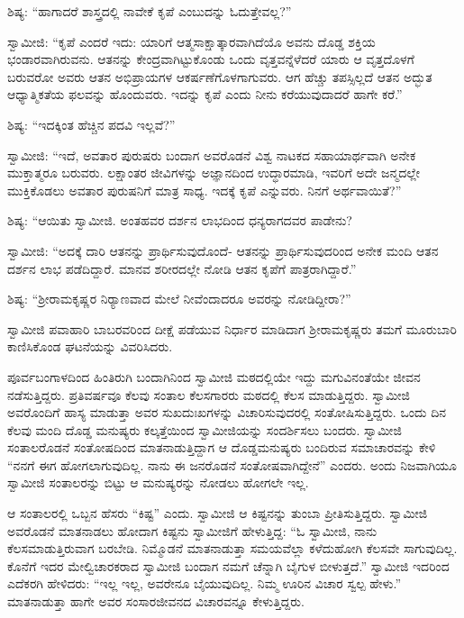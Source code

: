  ಶಿಷ್ಯ: “ಹಾಗಾದರೆ ಶಾಸ್ತ್ರದಲ್ಲಿ ನಾವೇಕೆ ಕೃಪೆ ಎಂಬುದನ್ನು ಓದುತ್ತೇವಲ್ಲ?” 

 ಸ್ವಾಮೀಜಿ: “ಕೃಪೆ ಎಂದರೆ ಇದು: ಯಾರಿಗೆ ಆತ್ಮಸಾಕ್ಷಾತ್ಕಾರವಾಗಿದೆಯೊ ಅವನು ದೊಡ್ಡ ಶಕ್ತಿಯ ಭಂಡಾರವಾಗಿರುವನು. ಆತನನ್ನು ಕೇಂದ್ರವಾಗಿಟ್ಟುಕೊಂಡು ಒಂದು ವೃತ್ತವನ್ನೆಳೆದರೆ ಯಾರು ಆ ವೃತ್ತದೊಳಗೆ ಬರುವರೋ ಅವರು ಆತನ ಅಭಿಪ್ರಾಯಗಳ ಆಕರ್ಷಣೆಗೊಳಗಾಗುವರು. ಆಗ ಹೆಚ್ಚು ತಪಸ್ಸಿಲ್ಲದೆ ಆತನ ಅದ್ಭುತ ಆಧ್ಯಾತ್ಮಿಕತೆಯ ಫಲವನ್ನು ಹೊಂದುವರು. ಇದನ್ನು ಕೃಪೆ ಎಂದು ನೀನು ಕರೆಯುವುದಾದರೆ ಹಾಗೇ ಕರೆ.” 

 ಶಿಷ್ಯ: “ಇದಕ್ಕಿಂತ ಹೆಚ್ಚಿನ ಪದವಿ ಇಲ್ಲವೆ?” 

 ಸ್ವಾಮೀಜಿ: “ಇದೆ, ಅವತಾರ ಪುರುಷರು ಬಂದಾಗ ಅವರೊಡನೆ ವಿಶ್ವ ನಾಟಕದ ಸಹಾಯಾರ್ಥವಾಗಿ ಅನೇಕ ಮುಕ್ತಾತ್ಮರೂ ಬರುವರು. ಲಕ್ಷಾಂತರ ಜೀವಿಗಳನ್ನು ಅಜ್ಞಾನದಿಂದ ಉದ್ಧಾರಮಾಡಿ, ಇವರಿಗೆ ಅದೇ ಜನ್ಮದಲ್ಲೇ ಮುಕ್ತಿಕೊಡಲು ಅವತಾರ ಪುರುಷನಿಗೆ ಮಾತ್ರ ಸಾಧ್ಯ. ಇದಕ್ಕೆ ಕೃಪೆ ಎನ್ನುವರು. ನಿನಗೆ ಅರ್ಥವಾಯಿತೆ?” 

 ಶಿಷ್ಯ: “ಆಯಿತು ಸ್ವಾಮೀಜಿ. ಅಂತಹವರ ದರ್ಶನ ಲಾಭದಿಂದ ಧನ್ಯರಾಗದವರ ಪಾಡೇನು? 

 ಸ್ವಾಮೀಜಿ: “ಅದಕ್ಕೆ ದಾರಿ ಆತನನ್ನು ಪ್ರಾರ್ಥಿಸುವುದೊಂದೆ- ಆತನನ್ನು ಪ್ರಾರ್ಥಿಸುವುದರಿಂದ ಅನೇಕ ಮಂದಿ ಆತನ ದರ್ಶನ ಲಾಭ ಪಡೆದಿದ್ದಾರೆ. ಮಾನವ ಶರೀರದಲ್ಲೇ ನೋಡಿ ಆತನ ಕೃಪೆಗೆ ಪಾತ್ರರಾಗಿದ್ದಾರೆ.” 

 ಶಿಷ್ಯ: “ಶ‍್ರೀರಾಮಕೃಷ್ಣರ ನಿರ‍್ಯಾಣವಾದ ಮೇಲೆ ನೀವೆಂದಾದರೂ ಅವರನ್ನು ನೋಡಿದ್ದೀರಾ?” 

 ಸ್ವಾಮೀಜಿ ಪವಾಹಾರಿ ಬಾಬರವರಿಂದ ದೀಕ್ಷೆ ಪಡೆಯುವ ನಿರ್ಧಾರ ಮಾಡಿದಾಗ ಶ‍್ರೀರಾಮಕೃಷ್ಣರು ತಮಗೆ ಮೂರುಬಾರಿ ಕಾಣಿಸಿಕೊಂಡ ಘಟನೆಯನ್ನು ವಿವರಿಸಿದರು. 

\delimiter

 ಪೂರ್ವಬಂಗಾಳದಿಂದ ಹಿಂತಿರುಗಿ ಬಂದಾಗಿನಿಂದ ಸ್ವಾಮೀಜಿ ಮಠದಲ್ಲಿಯೇ ಇದ್ದು ಮಗುವಿನಂತೆಯೇ ಜೀವನ ನಡೆಸುತ್ತಿದ್ದರು. ಪ್ರತಿವರ್ಷವೂ ಕೆಲವು ಸಂತಾಲ ಕೆಲಸಗಾರರು ಮಠದಲ್ಲಿ ಕೆಲಸ ಮಾಡುತ್ತಿದ್ದರು. ಸ್ವಾಮೀಜಿ ಅವರೊಂದಿಗೆ ಹಾಸ್ಯ ಮಾಡುತ್ತಾ ಅವರ ಸುಖದುಃಖಗಳನ್ನು ವಿಚಾರಿಸುವುದರಲ್ಲಿ ಸಂತೋಷಿಸುತ್ತಿದ್ದರು. ಒಂದು ದಿನ ಕೆಲವು ಮಂದಿ ದೊಡ್ಡ ಮನುಷ್ಯರು ಕಲ್ಕತ್ತೆಯಿಂದ ಸ್ವಾಮೀಜಿಯನ್ನು ಸಂದರ್ಶಿಸಲು ಬಂದರು. ಸ್ವಾಮೀಜಿ ಸಂತಾಲರೊಡನೆ ಸಂತೋಷದಿಂದ ಮಾತನಾಡುತ್ತಿದ್ದಾಗ ಆ ದೊಡ್ಡಮನುಷ್ಯರು ಬಂದಿರುವ ಸಮಾಚಾರವನ್ನು ಕೇಳಿ “ನನಗೆ ಈಗ ಹೋಗಲಾಗುವುದಿಲ್ಲ. ನಾನು ಈ ಜನರೊಡನೆ ಸಂತೋಷವಾಗಿದ್ದೇನೆ” ಎಂದರು. ಅಂದು ನಿಜವಾಗಿಯೂ ಸ್ವಾಮೀಜಿ ಸಂತಾಲರನ್ನು ಬಿಟ್ಟು ಆ ಮನುಷ್ಯರನ್ನು ನೋಡಲು ಹೋಗಲೇ ಇಲ್ಲ. 

 ಆ ಸಂತಾಲರಲ್ಲಿ ಒಬ್ಬನ ಹೆಸರು “ಕಿಷ್ಟ” ಎಂದು. ಸ್ವಾಮೀಜಿ ಆ ಕಿಷ್ಟನನ್ನು ತುಂಬಾ ಪ್ರೀತಿಸುತ್ತಿದ್ದರು. ಸ್ವಾಮೀಜಿ ಅವರೊಡನೆ ಮಾತನಾಡಲು ಹೋದಾಗ ಕಿಷ್ಟನು ಸ್ವಾಮೀಜಿಗೆ ಹೇಳುತ್ತಿದ್ದ: “ಓ ಸ್ವಾಮೀಜಿ, ನಾನು ಕೆಲಸಮಾಡುತ್ತಿರುವಾಗ ಬರಬೇಡಿ. ನಿಮ್ಮೊಡನೆ ಮಾತನಾಡುತ್ತಾ ಸಮಯವೆಲ್ಲಾ ಕಳೆದುಹೋಗಿ ಕೆಲಸವೇ ಸಾಗುವುದಿಲ್ಲ. ಕೊನೆಗೆ ಇದರ ಮೇಲ್ವಿಚಾರಕರಾದ ಸ್ವಾಮೀಜಿ ಬಂದಾಗ ನಮಗೆ ಚೆನ್ನಾಗಿ ಬೈಗುಳ ಬೀಳುತ್ತದೆ.” ಸ್ವಾಮೀಜಿ ಇದರಿಂದ ಎದೆಕರಗಿ ಹೇಳಿದರು: “ಇಲ್ಲ ಇಲ್ಲ, ಅವರೇನೂ ಬೈಯುವುದಿಲ್ಲ. ನಿಮ್ಮ ಊರಿನ ವಿಚಾರ ಸ್ವಲ್ಪ ಹೇಳು.” ಮಾತನಾಡುತ್ತಾ ಹಾಗೇ ಅವರ ಸಂಸಾರಜೀವನದ ವಿಚಾರವನ್ನೂ ಕೇಳುತ್ತಿದ್ದರು. 

